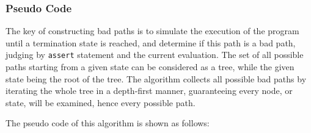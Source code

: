 \subsubsection{Pseudo Code}

The key of constructing bad paths is to simulate the execution of the program until a termination state is reached, and determine if this path is a bad path, judging by \lstinline|assert| statement and the current evaluation.
The set of all possible paths starting from a given state can be considered as a tree, while the given state being the root of the tree. The algorithm collects all possible bad paths by iterating the whole tree in a depth-first manner, guaranteeing every node, or state, will be examined, hence every possible path.

The pseudo code of this algorithm is shown as follows:

